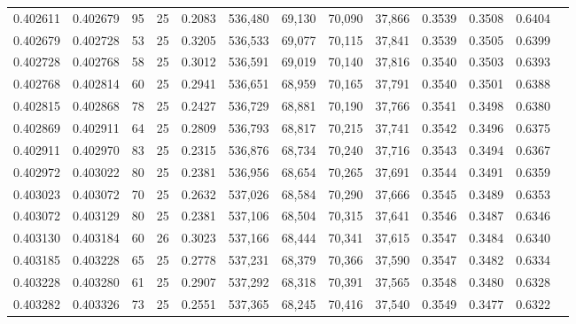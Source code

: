\begin{tabular}{rrrrrrrrrrrrr}
0.402611 & 0.402679 &    95 &  25 &                                     0.2083 & 536,480 &  69,130 &  70,090 &  37,866 & 0.3539 & 0.3508 & 0.6404 \\
0.402679 & 0.402728 &    53 &  25 &                                     0.3205 & 536,533 &  69,077 &  70,115 &  37,841 & 0.3539 & 0.3505 & 0.6399 \\
0.402728 & 0.402768 &    58 &  25 &                                     0.3012 & 536,591 &  69,019 &  70,140 &  37,816 & 0.3540 & 0.3503 & 0.6393 \\
0.402768 & 0.402814 &    60 &  25 &                                     0.2941 & 536,651 &  68,959 &  70,165 &  37,791 & 0.3540 & 0.3501 & 0.6388 \\
0.402815 & 0.402868 &    78 &  25 &                                     0.2427 & 536,729 &  68,881 &  70,190 &  37,766 & 0.3541 & 0.3498 & 0.6380 \\
0.402869 & 0.402911 &    64 &  25 &                                     0.2809 & 536,793 &  68,817 &  70,215 &  37,741 & 0.3542 & 0.3496 & 0.6375 \\
0.402911 & 0.402970 &    83 &  25 &                                     0.2315 & 536,876 &  68,734 &  70,240 &  37,716 & 0.3543 & 0.3494 & 0.6367 \\
0.402972 & 0.403022 &    80 &  25 &                                     0.2381 & 536,956 &  68,654 &  70,265 &  37,691 & 0.3544 & 0.3491 & 0.6359 \\
0.403023 & 0.403072 &    70 &  25 &                                     0.2632 & 537,026 &  68,584 &  70,290 &  37,666 & 0.3545 & 0.3489 & 0.6353 \\
0.403072 & 0.403129 &    80 &  25 &                                     0.2381 & 537,106 &  68,504 &  70,315 &  37,641 & 0.3546 & 0.3487 & 0.6346 \\
0.403130 & 0.403184 &    60 &  26 &                                     0.3023 & 537,166 &  68,444 &  70,341 &  37,615 & 0.3547 & 0.3484 & 0.6340 \\
0.403185 & 0.403228 &    65 &  25 &                                     0.2778 & 537,231 &  68,379 &  70,366 &  37,590 & 0.3547 & 0.3482 & 0.6334 \\
0.403228 & 0.403280 &    61 &  25 &                                     0.2907 & 537,292 &  68,318 &  70,391 &  37,565 & 0.3548 & 0.3480 & 0.6328 \\
0.403282 & 0.403326 &    73 &  25 &                                     0.2551 & 537,365 &  68,245 &  70,416 &  37,540 & 0.3549 & 0.3477 & 0.6322 \\

\end{tabular}
